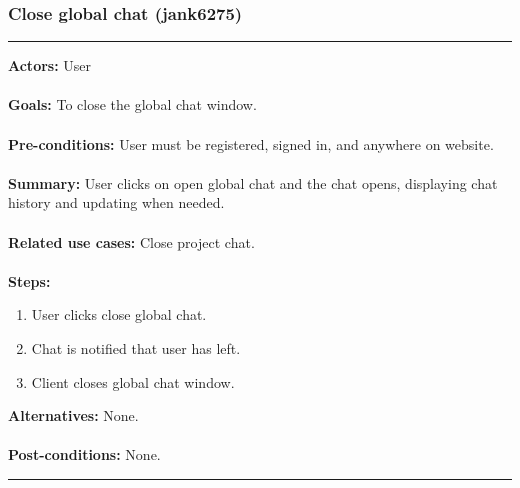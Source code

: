 \documentclass[11pt]{report}
\begin{document}
\subsubsection{Close global chat (jank6275)}
\vspace{2pt}
\hrule
\vspace{8pt}
 \textbf{Actors:} User \\ \\
\textbf{Goals:} To close the global chat window. \\ \\
 \textbf{Pre-conditions:} User must be registered, signed in, and anywhere on website.  \\ \\
 \textbf{Summary:} User clicks on open global chat and the chat opens, displaying chat history and updating when needed. \\ \\
\textbf{Related use cases:} Close project chat. \\ \\
\textbf{Steps:} \begin{enumerate}
  \item User clicks close global chat.
  \item Chat is notified that user has left.
  \item Client closes global chat window.
 \end{enumerate}
 \textbf{Alternatives:} None. \\ \\
 \textbf{Post-conditions:} None. \\
\vspace{8pt}
\hrule
\newpage
\end{document}
